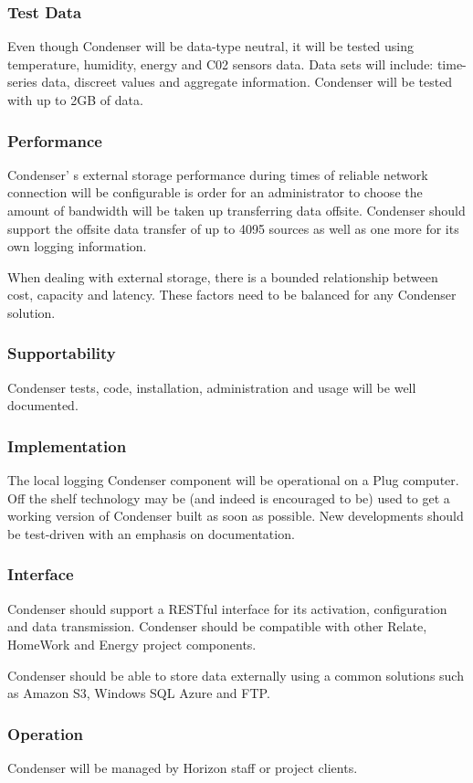 		\subsubsection{Test Data}
Even though Condenser will be data-type neutral, it will be tested using temperature, humidity, energy and C02 sensors data. Data sets will include: time-series data, discreet values and aggregate information. Condenser will be tested with up to 2GB of data.		
		\subsubsection{Performance}
Condenser'	s external storage performance during times of reliable network connection will be configurable is order for an administrator to choose the amount of bandwidth will be taken up transferring data offsite. Condenser should support the offsite data transfer of up to 4095 sources as well as one more for its own logging information.

When dealing with external storage, there is a bounded relationship between cost, capacity and latency. These factors need to be balanced for any Condenser solution. 	
		\subsubsection{Supportability}
Condenser tests, code, installation, administration and usage will be well documented.	
		\subsubsection{Implementation}
The local logging Condenser component will be operational on a Plug computer. Off the shelf technology may be (and indeed is encouraged to be) used to get a working version of Condenser built as soon as possible. New developments should be test-driven with an emphasis on documentation. 		
		\subsubsection{Interface}
Condenser should support a RESTful interface for its activation, configuration and data transmission. Condenser should be compatible with other Relate, HomeWork and Energy project components.

Condenser should be able to store data externally using a common solutions such as	Amazon S3, Windows SQL Azure and FTP.
		\subsubsection{Operation}
Condenser will be managed by Horizon staff or project clients.		
